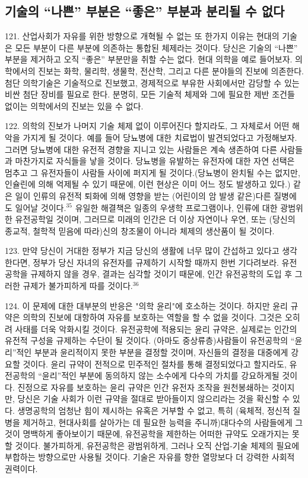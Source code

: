 \documentclass[11pt,a4paper]{article}
\begin{document}
\begin{multicols}{2}
\section*{기술의 “나쁜” 부분은 “좋은” 부분과 분리될 수 없다} 
121. 산업사회가 자유를 위한 방향으로 개혁될 수 없는 또 한가지 이유는 현대의 기술은 모든 부분이  다른 부분에 의존하는 통합된 체제라는 것이다. 당신은 기술의 “나쁜” 부분을 제거하고 오직 “좋은”  부분만을 취할 수는 없다. 현대 의학을 예로 들어보자. 의학에서의 진보는 화학, 물리학, 생물학, 전산학,  그리고 다른 분야들의 진보에 의존한다. 첨단 의학기술은 기술적으로 진보했고, 경제적으로 부유한  사회에서만 감당할 수 있는 비싼 첨단 장비를 필요로 한다. 분명히, 모든 기술적 체제와 그에 필요한 제반 조건들 없이는 의학에서의 진보는 있을 수 없다.  


122. 의학의 진보가 나머지 기술 체제 없이 이루어진다 할지라도, 그 자체로서 어떤 해악을 가지게 될  것이다. 예를 들어 당뇨병에 대한 치료법이 발견되었다고 가정해보자. 그러면 당뇨병에 대한 유전적  경향을 지니고 있는 사람들은 계속 생존하여 다른 사람들과 마찬가지로 자식들을 낳을 것이다. 당뇨병을  유발하는 유전자에 대한 자연 선택은 멈추고 그 유전자들이 사람들 사이에 퍼지게 될 것이다.(당뇨병이  완치될 수는 없지만, 인슐린에 의해 억제될 수 있기 때문에, 이런 현상은 이미 어느 정도 발생하고 있다.)  같은 일이 인류의 유전적 퇴화에 의해 영향을 받는 (어린이의 암 발생 같은)다른 질병에도 일어날 것이다.\hyperlink{35}{$^{35}$} 유일한 해결책은 일종의 우생학 프로그램이나, 인류에 대한 광범위한 유전공학일 것이며, 그러므로  미래의 인간은 더 이상 자연이나 우연, 또는 (당신의 종교적, 철학적 믿음에 따라)신의 창조물이 아니라  체제의 생산품이 될 것이다.  


123. 만약 당신이 거대한 정부가 지금 당신의 생활에 너무 많이 간섭하고 있다고 생각한다면, 정부가  당신 자녀의 유전자를 규제하기 시작할 때까지 한번 기다려보라. 유전공학을 규제하지 않을 경우, 결과는  심각할 것이기 때문에, 인간 유전공학의 도입 후 그러한 규제가 불가피하게 따를 것이다.\hyperlink{36}{$^{36}$} 


124. 이 문제에 대한 대부분의 반응은 "의학 윤리"에 호소하는 것이다. 하지만 윤리 규약은 의학의  진보에 대항하여 자유를 보호하는 역할을 할 수 없을 것이다. 그것은 오히려 사태를 더욱 악화시킬  것이다. 유전공학에 적용되는 윤리 규약은, 실제로는 인간의 유전적 구성을 규제하는 수단이 될 것이다.  (아마도 중상류층)사람들이 유전공학의 “윤리”적인 부분과 윤리적이지 못한 부분을 결정할 것이며,  자신들의 결정을 대중에게 강요할 것이다. 윤리 규약이 전적으로 민주적인 절차를 통해 결정되었다고 
할지라도, 유전공학의 “윤리”적인 부분에 동의하지 않는 소수에게 다수의 가치를 강요하게될 것이다.  진정으로 자유를 보호하는 윤리 규약은 인간 유전자 조작을 원천봉쇄하는 것이지만, 당신은 기술 사회가  이런 규약을 절대로 받아들이지 않으리라는 것을 확신할 수 있다. 생명공학의 엄청난 힘이 제시하는  유혹은 거부할 수 없고, 특히 (육체적, 정신적 질병을 제거하고, 현대사회를 살아가는 데 필요한 능력을  주니까)대다수의 사람들에게 그것이 명백하게 좋아보이기 때문에, 유전공학을 제한하는 어떠한 규약도  오래가지는 못할 것이다. 불가피하게, 유전공학은 광범위하게, 그러나 오직 산업-기술 체제의 필요에  부합하는 방향으로만 사용될 것이다. 
기술은 자유를 향한 열망보다 더 강력한 사회적 권력이다. 



\end{multicols}
\end{document}
